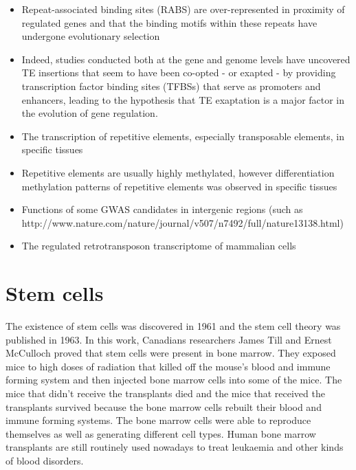 \begin{itemize}
   \item Repeat-associated binding sites (RABS) are over-represented in proximity of regulated genes and that the binding motifs within these repeats have undergone evolutionary selection
   \item Indeed, studies conducted both at the gene and genome levels have uncovered TE insertions that seem to have been co-opted - or exapted - by providing transcription factor binding sites (TFBSs) that serve as promoters and enhancers, leading to the hypothesis that TE exaptation is a major factor in the evolution of gene regulation.
   \item The transcription of repetitive elements, especially transposable elements, in specific tissues
   \item Repetitive elements are usually highly methylated, however differentiation methylation patterns of repetitive elements was observed in specific tissues
   \item Functions of some GWAS candidates in intergenic regions (such as http://www.nature.com/nature/journal/v507/n7492/full/nature13138.html)
   \item The regulated retrotransposon transcriptome of mammalian cells\cite{pmid19377475}
\end{itemize}

\section{Stem cells}

The existence of stem cells was discovered in 1961 and the stem cell theory was published in 1963\cite{pmid13970094}. In this work, Canadians researchers James Till and Ernest McCulloch proved that stem cells were present in bone marrow. They exposed mice to high doses of radiation that killed off the mouse's blood and immune forming system and then injected bone marrow cells into some of the mice. The mice that didn't receive the transplants died and the mice that received the transplants survived because the bone marrow cells rebuilt their blood and immune forming systems. The bone marrow cells were able to reproduce themselves as well as generating different cell types. Human bone marrow transplants are still routinely used nowadays to treat leukaemia and other kinds of blood disorders.

